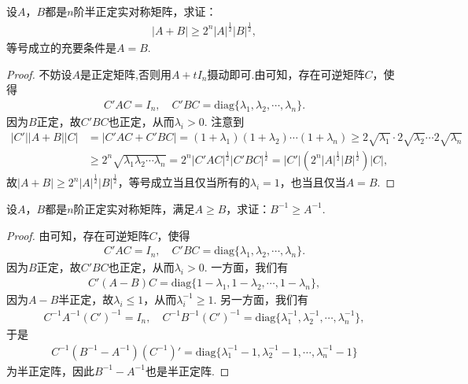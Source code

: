 \documentclass[../../main.tex]{subfiles}%
\begin{document}
\begin{proposition}\label{proposition:例9.77}
设\(A\)，\(B\)都是\(n\)阶半正定实对称矩阵，求证：
\begin{align*}
\vert A + B\vert\geqslant 2^n\vert A\vert^{\frac{1}{2}}\vert B\vert^{\frac{1}{2}},
\end{align*}
等号成立的充要条件是\(A = B\).
\end{proposition}
\begin{proof}

不妨设$A$是正定矩阵,否则用$A+tI_n$摄动即可.由可知，存在可逆矩阵\(C\)，使得
\begin{align*}
C'AC = I_n,\quad C'BC = \mathrm{diag}\{\lambda_1,\lambda_2,\cdots,\lambda_n\}.
\end{align*}
因为\(B\)正定，故\(C'BC\)也正定，从而\(\lambda_i>0\). 注意到
\begin{align*}
\vert C'\vert\vert A + B\vert\vert C\vert&=\vert C'AC + C'BC\vert=(1 + \lambda_1)(1 + \lambda_2)\cdots(1 + \lambda_n)\geqslant 2\sqrt{\lambda _1}\cdot 2\sqrt{\lambda _2}\cdots 2\sqrt{\lambda _n}\\
&\geqslant 2^n\sqrt{\lambda_1\lambda_2\cdots\lambda_n}=2^n\vert C'AC\vert^{\frac{1}{2}}\vert C'BC\vert^{\frac{1}{2}}=\vert C'\vert(2^n\vert A\vert^{\frac{1}{2}}\vert B\vert^{\frac{1}{2}})\vert C\vert,
\end{align*}
故\(\vert A + B\vert\geqslant 2^n\vert A\vert^{\frac{1}{2}}\vert B\vert^{\frac{1}{2}}\)，等号成立当且仅当所有的\(\lambda_i = 1\)，也当且仅当\(A = B\).

\end{proof}

\begin{example}\label{example:例9.78}
设\(A\)，\(B\)都是\(n\)阶正定实对称矩阵，满足\(A\geqslant  B\)，求证：\(B^{-1}\geqslant  A^{-1}\).
\end{example}
\begin{proof}

由可知，存在可逆矩阵\(C\)，使得
\begin{align*}
C'AC = I_n,\quad C'BC = \mathrm{diag}\{\lambda_1,\lambda_2,\cdots,\lambda_n\}.
\end{align*}
因为\(B\)正定，故\(C'BC\)也正定，从而\(\lambda_i>0\). 一方面，我们有
\begin{align*}
C'(A - B)C = \mathrm{diag}\{1 - \lambda_1,1 - \lambda_2,\cdots,1 - \lambda_n\},
\end{align*}
因为\(A - B\)半正定，故\(\lambda_i\leqslant 1\)，从而\(\lambda_i^{-1}\geqslant 1\). 另一方面，我们有
\begin{align*}
C^{-1}A^{-1}(C')^{-1} = I_n,\quad C^{-1}B^{-1}(C')^{-1} = \mathrm{diag}\{\lambda_1^{-1},\lambda_2^{-1},\cdots,\lambda_n^{-1}\},
\end{align*}
于是
\begin{align*}
C^{-1}(B^{-1} - A^{-1})(C^{-1})' = \mathrm{diag}\{\lambda_1^{-1} - 1,\lambda_2^{-1} - 1,\cdots,\lambda_n^{-1} - 1\}
\end{align*}
为半正定阵，因此\(B^{-1} - A^{-1}\)也是半正定阵.

\end{proof}
\end{document}
